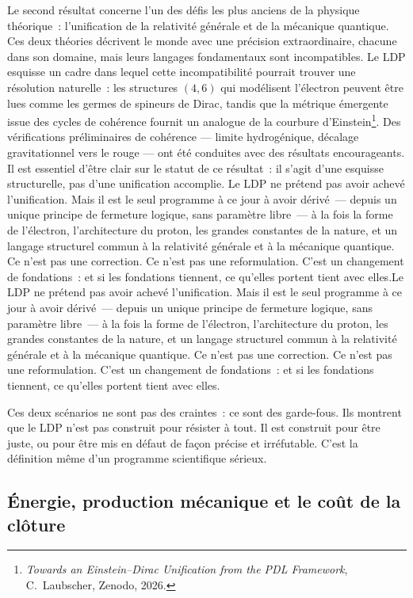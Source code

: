 \documentclass[12pt, a4paper, openright]{book}
\begin{document}
Le second résultat concerne l'un des défis les plus anciens de la physique théorique~: l'unification de la relativité générale et de la mécanique quantique. Ces deux théories décrivent le monde avec une précision extraordinaire, chacune dans son domaine, mais leurs langages fondamentaux sont incompatibles. Le LDP esquisse un cadre dans lequel cette incompatibilité pourrait trouver une résolution naturelle~: les structures $(4,6)$ qui modélisent l'électron peuvent être lues comme les germes de spineurs de Dirac, tandis que la métrique émergente issue des cycles de cohérence fournit un analogue de la courbure d'Einstein\footnote{\textit{Towards an Einstein--Dirac Unification from the PDL Framework}, C.~Laubscher, Zenodo, 2026.}. Des vérifications préliminaires de cohérence --- limite hydrogénique, décalage gravitationnel vers le rouge --- ont été conduites avec des résultats encourageants. Il est essentiel d'être clair sur le statut de ce résultat~: il s'agit d'une esquisse structurelle, pas d'une unification accomplie. Le LDP ne prétend pas avoir achevé l'unification. Mais il est le seul programme à ce jour à avoir dérivé~--- depuis un unique principe de fermeture logique, sans paramètre libre~--- à la fois la forme de l'électron, l'architecture du proton, les grandes constantes de la nature, et un langage structurel commun à la relativité générale et à la mécanique quantique. Ce n'est pas une correction. Ce n'est pas une reformulation. C'est un changement de fondations~: et si les fondations tiennent, ce qu'elles portent tient avec elles.Le LDP ne prétend pas avoir achevé l'unification. Mais il est le seul programme à ce jour à avoir dérivé~--- depuis un unique principe de fermeture logique, sans paramètre libre~--- à la fois la forme de l'électron, l'architecture du proton, les grandes constantes de la nature, et un langage structurel commun à la relativité générale et à la mécanique quantique. Ce n'est pas une correction. Ce n'est pas une reformulation. C'est un changement de fondations~: et si les fondations tiennent, ce qu'elles portent tient avec elles.

\medskip

Ces deux scénarios ne sont pas des craintes~: ce sont des garde-fous. Ils montrent que le LDP n'est pas construit pour résister à tout. Il est construit pour être juste, ou pour être mis en défaut de façon précise et irréfutable. C'est la définition même d'un programme scientifique sérieux.

\subsection*{Énergie, production mécanique et le coût de la clôture}
\end{document}
